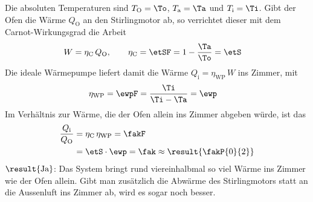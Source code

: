 \begin{center}
\end{center}

Die absoluten Temperaturen sind $T_\text{O} = \To$, $T_\text{a} = \Ta$ und $T_\text{i} = \Ti$. Gibt der Ofen die Wärme $Q_\text{O}$ an den Stirlingmotor ab, so verrichtet dieser mit dem Carnot-Wirkungsgrad die Arbeit
\begin{align}
 W &= \eta_\text{C}\,Q_\text{O}, \qquad \eta_\text{C} = \etSF = 1-\frac{\Ta}{\To} = \etS
\end{align}
Die ideale Wärmepumpe liefert damit die Wärme $Q_\text{i} = \eta_\text{WP}\,W$ ins Zimmer, mit
\begin{align}
 \eta_\text{WP} &= \ewpF = \frac{\Ti}{\Ti-\Ta} = \ewp
\end{align}
Im Verhältnis zur Wärme, die der Ofen allein ins Zimmer abgeben würde, ist das
\begin{align}
 \frac{Q_\text{i}}{Q_\text{O}} &= \eta_\text{C}\,\eta_\text{WP} = \fakF \\
   &= \etS\cdot\ewp = \fak \approx \result{\fakP{0}{2}}
\end{align}
$\result{\text{Ja}}$: Das System bringt rund viereinhalbmal so viel Wärme ins Zimmer wie der Ofen allein. Gibt man zusätzlich die Abwärme des Stirlingmotors statt an die Aussenluft ins Zimmer ab, wird es sogar noch besser.
